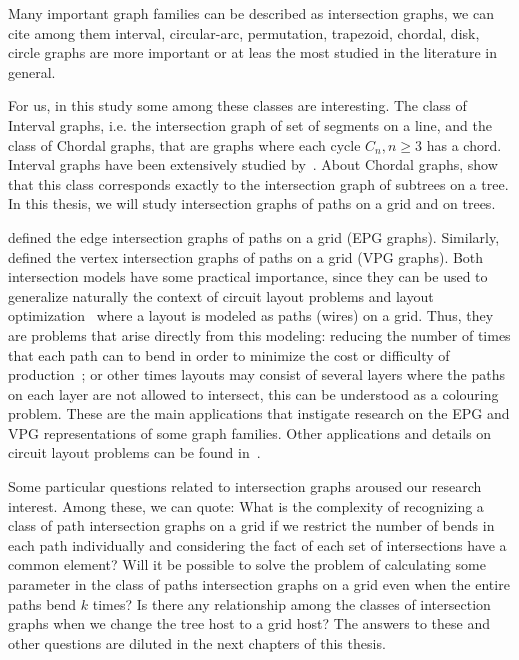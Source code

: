Many important graph families can be described as intersection graphs, we can cite among them interval, circular-arc, permutation, trapezoid, chordal,
disk, circle graphs are more important or at leas the most studied in the literature in general. 

For us, in this study some among these classes are interesting. The class of Interval graphs, i.e. the intersection graph of set of segments on a line, and the class of Chordal graphs, that are graphs where each cycle $C_n, n\geq 3$ has a chord. Interval graphs have been extensively studied by~\cite{lekkeikerker1962representation}. About Chordal graphs, \citet{gavril1974intersection} show that this class corresponds exactly to the intersection graph of subtrees on a tree. In this thesis, we will study intersection graphs of paths on a grid and on trees.

\citet{golumbic2009} defined the edge intersection graphs of paths on a grid (EPG graphs). Similarly, \cite{asinowski2011string, asinowski2012} defined the vertex intersection graphs of paths on a grid (VPG graphs).  Both intersection models have some practical importance, since they can be used to generalize naturally the context of
circuit layout problems and layout optimization~\cite{sinden1966topology} where a layout is modeled
as paths (wires) on a grid. Thus, they are problems that arise directly from this modeling: reducing the number of times that each path can to bend in order to minimize the cost or difficulty of production~\cite{bandy1990,molitor1991}; or  other times layouts may consist of several layers where the paths on each layer are not allowed to intersect, this can be understood as a colouring problem. These are the main applications that instigate research on the EPG and VPG representations of some graph families. Other applications and details on circuit layout problems can be found in~\cite{bandy1990, molitor1991, sinden1966topology}.

Some particular questions related to intersection graphs aroused our research interest. Among these, we can quote: What is the complexity of recognizing a class of path intersection graphs on a grid if we restrict the number of bends in each path individually and considering the fact of each set of intersections have a common element? Will it be possible to solve the problem of calculating some parameter in the class of paths intersection graphs on a grid  even when the entire paths bend $k$ times? Is there any relationship among the classes of intersection graphs when we change the tree host to a grid host? The answers to these and other questions are diluted in the next chapters of this thesis.


